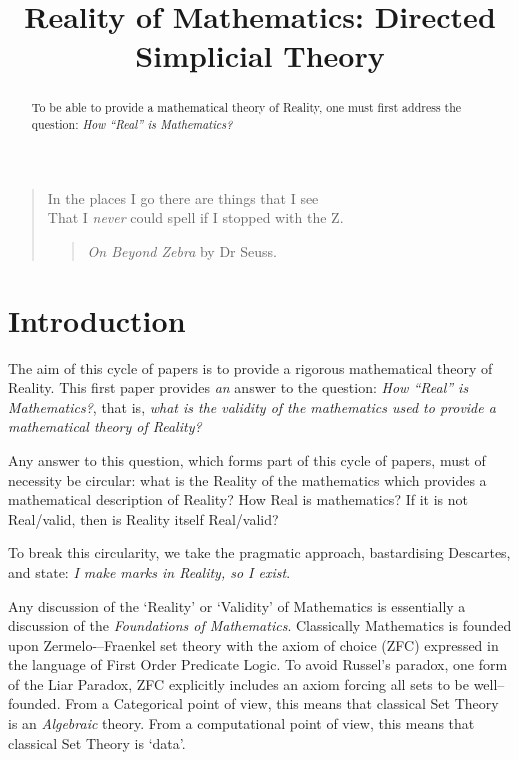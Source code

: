 \documentclass[a4paper,openany]{amsbook}
\begin{document}
\frontmatter
\sloppy

\title[DiSimplicial Theory]{Reality of Mathematics: Directed Simplicial Theory}

%

\begin{abstract}
To be able to provide a mathematical theory of Reality, one must first 
address the question: \textit{How ``Real'' is Mathematics?}
\end{abstract} 
\maketitle 
\tableofcontents 
\mainmatter

\begin{quotation}
In the places I go there are things that I see\\
That I \emph{never} could spell if I stopped with the Z.\\
\begin{quote}
\textit{On Beyond Zebra} by Dr Seuss.
\end{quote}
\end{quotation}

\section{Introduction}

The aim of this cycle of papers is to provide a rigorous mathematical theory of
Reality. This first paper provides \emph{an} answer to the question: \emph{How
``Real'' is Mathematics?}, that is, \emph{what is the validity of the
mathematics used to provide a mathematical theory of Reality?}

Any answer to this question, which forms part of this cycle of papers, must of
necessity be circular: what is the Reality of the mathematics which provides a
mathematical description of Reality? How Real is mathematics? If it is not
Real/valid, then is Reality itself Real/valid?

To break this circularity, we take the pragmatic approach, bastardising
Descartes, and state: \emph{I make marks in Reality, so I exist}.

Any discussion of the `Reality' or `Validity' of Mathematics is essentially a
discussion of the \textit{Foundations of Mathematics}. Classically Mathematics
is founded upon Zermelo-–Fraenkel set theory with the axiom of choice (ZFC)
expressed in the language of First Order Predicate Logic. To avoid Russel's
paradox, one form of the Liar Paradox, ZFC explicitly includes an axiom forcing
all sets to be well--founded. From a Categorical point of view, this means that
classical Set Theory is an \emph{Algebraic} theory. From a computational point
of view, this means that classical Set Theory is `data'.
\end{document}
